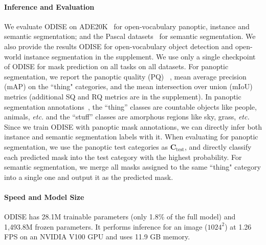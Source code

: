\documentclass[10pt,twocolumn,letterpaper]{article}
\newcommand{\ourmethod}{ODISE}
\begin{document}
\paragraph{Inference and Evaluation} 
We evaluate \ourmethod{} on ADE20K~\cite{zhou2019ade} for open-vocabulary panoptic, instance and semantic segmentation; and the Pascal datasets~\cite{everingham2010pascal, mottaghi2014ctx} for semantic segmentation. We also provide the results \ourmethod{} for open-vocabulary object detection and open-world instance segmentation in the supplement. We use only a single checkpoint of \ourmethod{} for mask prediction on all tasks on all datasets. For panoptic segmentation, we report the panoptic quality (PQ) ~\cite{kirillov2019panoptic}, mean average precision (mAP) on the ``thing" categories, and the mean intersection over union (mIoU) metrics (additional SQ and RQ metrics are in the supplement). In panoptic segmentation annotations~\cite{kirillov2019panoptic}, the ``thing'' classes are countable objects like people, animals, \textit{etc.} and the ``stuff'' classes are amorphous regions like sky, grass, \textit{etc.}
Since we train \ourmethod{} with panoptic mask annotations, we can directly infer both instance and semantic segmentation labels with it. 
When evaluating for panoptic segmentation, we use the panoptic test categories as $\mathbf{C}_\text{test}$, and directly classify each predicted mask into the test category with the highest probability. 
For semantic segmentation, we merge all masks assigned to the same ``thing" category into a single one and output it as the predicted mask.

\paragraph{Speed and Model Size}
\ourmethod{} has 28.1M trainable parameters (only 1.8\% of the full model) and 1,493.8M frozen parameters. It performs inference for an image ($1024^2$) at 1.26 FPS on an NVIDIA V100 GPU and uses 11.9 GB memory. 
\end{document}
